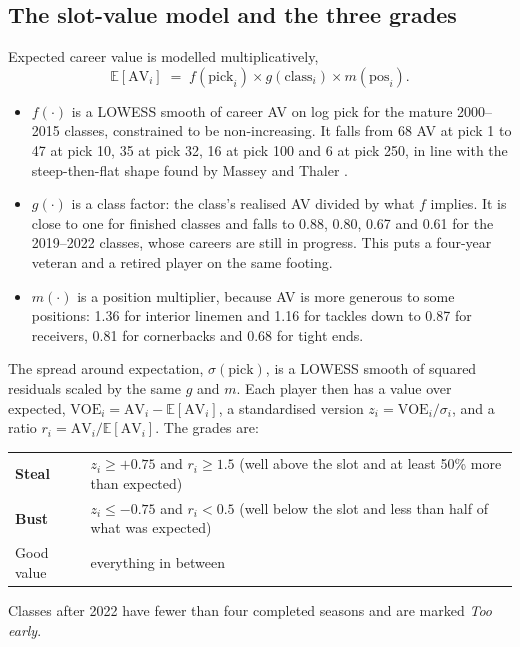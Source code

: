 \documentclass[11pt]{article}
\newcommand{\steal}{\textcolor{stealc}{\textbf{Steal}}}
\newcommand{\bust}{\textcolor{bustc}{\textbf{Bust}}}
\newcommand{\good}{\textcolor{goodc}{Good value}}
\newcommand{\early}{\textit{Too early}}
\newcommand{\AV}{\mathrm{AV}}
\begin{document}
\subsection{The slot-value model and the three grades}\label{sec:value}

Expected career value is modelled multiplicatively,
\begin{equation}
\mathbb{E}[\AV_i] \;=\; f(\mathrm{pick}_i)\times g(\mathrm{class}_i)\times m(\mathrm{pos}_i).
\end{equation}

\begin{itemize}[leftmargin=1.4em]
\item $f(\cdot)$ is a LOWESS smooth \cite{lowess} of career AV on log pick for the mature 2000--2015 classes, constrained to be non-increasing. It falls from 68 AV at pick 1 to 47 at pick 10, 35 at pick 32, 16 at pick 100 and 6 at pick 250, in line with the steep-then-flat shape found by Massey and Thaler \cite{massey}.
\item $g(\cdot)$ is a class factor: the class's realised AV divided by what $f$ implies. It is close to one for finished classes and falls to 0.88, 0.80, 0.67 and 0.61 for the 2019--2022 classes, whose careers are still in progress. This puts a four-year veteran and a retired player on the same footing.
\item $m(\cdot)$ is a position multiplier, because AV is more generous to some positions: 1.36 for interior linemen and 1.16 for tackles down to 0.87 for receivers, 0.81 for cornerbacks and 0.68 for tight ends.
\end{itemize}

The spread around expectation, $\sigma(\mathrm{pick})$, is a LOWESS smooth of squared residuals scaled by the same $g$ and $m$. Each player then has a value over expected, $\mathrm{VOE}_i=\AV_i-\mathbb{E}[\AV_i]$, a standardised version $z_i=\mathrm{VOE}_i/\sigma_i$, and a ratio $r_i=\AV_i/\mathbb{E}[\AV_i]$. The grades are:
\begin{center}\small\sffamily
\begin{tabular}{ll}
\toprule
\steal & $z_i\ge +0.75$ and $r_i\ge 1.5$ \quad (well above the slot and at least 50\% more than expected)\\
\bust & $z_i\le -0.75$ and $r_i< 0.5$ \quad (well below the slot and less than half of what was expected)\\
\good & everything in between\\
\bottomrule
\end{tabular}
\end{center}
Classes after 2022 have fewer than four completed seasons and are marked \early.
\end{document}
